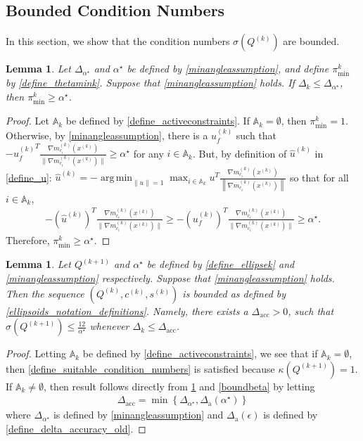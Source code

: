 \documentclass{article}
\newtheorem{lemma}[theorem]{Lemma}
\theoremstyle{case}
\numberwithin{theorem}{subsection}
\DeclareMathOperator*{\argmin}{arg\,min}
\newcommand{\activeconstraintsk}{{\mathbb A_{k}}}
\newcommand{\ck}{{c^{(k)}}}
\newcommand{\dacc}{{\Delta_{\textrm{acc}}}}
\newcommand{\dacco}{{\Delta_{\textrm{a}}}}
\newcommand{\dk}{\Delta_k}
\newcommand{\gmcik}{{\nabla m_{c_i}^{(k)}\left(\xk\right)}}
\newcommand{\huk}{{{\hat u}^{(k)}}}
\newcommand{\minanglealpha}{{ \alpha^{\star} }}
\newcommand{\minangledelta}{{\Delta_{\alpha^{\star}}}}
\newcommand{\qk}{{Q^{(k)}}}
\newcommand{\sk}{{{s}^{(k)}}}
\newcommand{\thetamink}{{\pi^k_{\textrm{min}}}}
\newcommand{\xk}{x^{(k)}}
\newcommand{\qkpo}{{Q^{(k+1)}}}
\newcommand{\minangledirk}{{u^{(k)}_f}}
\begin{document}
\subsection{Bounded Condition Numbers}
In this section, we show that the condition numbers $\sigma(\qk)$ are bounded.

\begin{lemma}
\label{theta_min_is_bounded}
Let $\minangledelta$ and $\minanglealpha$ be defined by \cref{minangleassumption}, and
define $\thetamink$ by \cref{define_thetamink}.
Suppose that \cref{minangleassumption} holds.
If $\dk \le \minangledelta$, then $\thetamink \ge \minanglealpha$.
\end{lemma}

\begin{proof}
Let $\activeconstraintsk$ be defined by \cref{define_activeconstraints}.
If $\activeconstraintsk = \emptyset$, then $\thetamink = 1$.
Otherwise, by \cref{minangleassumption}, there is a $\minangledirk$ such that 
$-\minangledirk^T\frac{\gmcik}{\|\gmcik\|} \ge \minanglealpha$ for any $i \in \activeconstraintsk$.
But, by definition of $\huk$ in \cref{define_u}:
$\huk = -\argmin_{\|u\| = 1} \max_{i \in \activeconstraintsk} u^T\frac{\gmcik}{\left\|\gmcik\right\|}$
so that for all $i \in \activeconstraintsk$,
\begin{align*}
-\left(\huk\right)^T\frac{\gmcik}{\|\gmcik\|}  \ge -\left(\minangledirk\right)^T\frac{\gmcik}{\|\gmcik\|} \ge \minanglealpha.
\end{align*}
Therefore, $\thetamink \ge \minanglealpha$.
\end{proof}

\begin{lemma}
\label{bounded_condition_numbers}
Let $\qkpo$ and $\minanglealpha$ be defined by \cref{define_ellipsek} and \cref{minangleassumption} respectively.
Suppose that \cref{minangleassumption} holds.
Then the sequence $\left(\qk, \ck, \sk\right)$ is bounded as defined by \cref{ellipsoids_notation_definitions}.
Namely, there exists a $\dacc > 0$, such that $\sigma(\qkpo) \le \frac {12}{\minanglealpha}$ whenever $\dk \le \dacc$.
\end{lemma}
\begin{proof}
Letting $\activeconstraintsk$ be defined by \cref{define_activeconstraints},
we see that if $\activeconstraintsk = \emptyset$, then \cref{define_suitable_condition_numbers} is satisfied because $\kappa(\qkpo) = 1$.
If $\activeconstraintsk \ne \emptyset$, then result follows directly from \cref{theta_min_is_bounded} and \cref{boundbeta} by letting
\begin{align}
\dacc = \min\left\{\minangledelta, \dacco(\minanglealpha) \right\} \label{define_delta_accuracy}
\end{align}
where $\minangledelta$ is defined by \cref{minangleassumption} and $\dacco(\epsilon)$ is defined by \cref{define_delta_accuracy_old}.
\end{proof}
\end{document}
